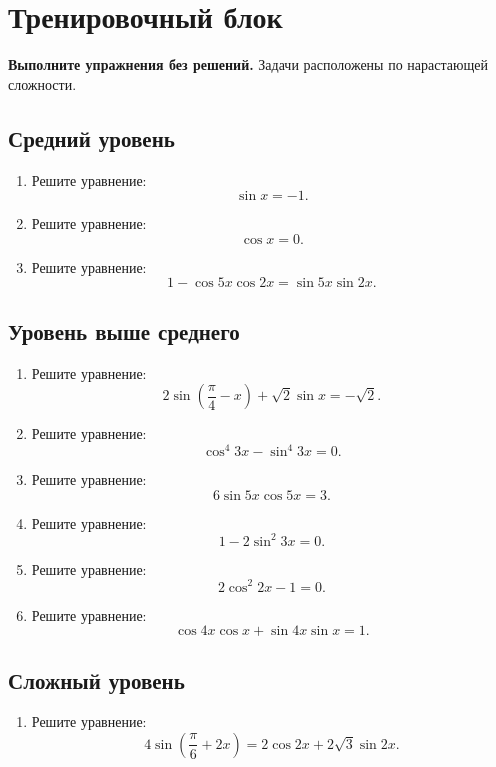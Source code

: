 \documentclass[a4paper,12pt]{article}
\begin{document}
\newpage

\section*{Тренировочный блок}

\textbf{Выполните упражнения без решений.} Задачи расположены по нарастающей сложности.

\subsection*{Средний уровень}

\begin{enumerate}
    \item Решите уравнение:
    \[
        \sin x=-1.
    \]

    \item Решите уравнение:
    \[
        \cos x=0.
    \]

    \item Решите уравнение:
    \[
        1-\cos 5x\cos 2x=\sin 5x\sin 2x.
    \]
\end{enumerate}

\subsection*{Уровень выше среднего}

\begin{enumerate}[resume]
    \item Решите уравнение:
    \[
        2\sin\left(\frac{\pi}{4}-x\right)+\sqrt2\sin x=-\sqrt2.
    \]

    \item Решите уравнение:
    \[
        \cos^4 3x-\sin^4 3x=0.
    \]

    \item Решите уравнение:
    \[
        6\sin 5x\cos 5x=3.
    \]

    \item Решите уравнение:
    \[
        1-2\sin^2 3x=0.
    \]

    \item Решите уравнение:
    \[
        2\cos^2 2x-1=0.
    \]

    \item Решите уравнение:
    \[
        \cos 4x\cos x+\sin 4x\sin x=1.
    \]
\end{enumerate}

\subsection*{Сложный уровень}

\begin{enumerate}[resume]
    \item Решите уравнение:
    \[
        4\sin\left(\frac{\pi}{6}+2x\right)
        =
        2\cos 2x+2\sqrt3\sin 2x.
    \]
\end{enumerate}
\end{document}
